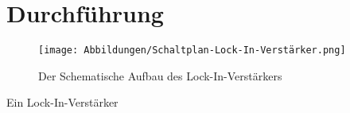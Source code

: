 \section{Durchführung}
\begin{figure}
    \texttt{[image: Abbildungen/Schaltplan-Lock-In-Verstärker.png]}
    \caption{Der Schematische Aufbau des Lock-In-Verstärkers \cite[][]{man:v303}}
    \label{fig:Lock-In-Schema}
\end{figure}
Ein Lock-In-Verstärker 